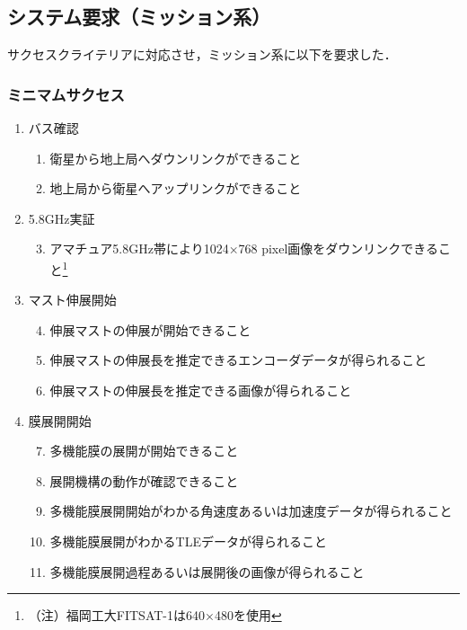 \subsection{システム要求（ミッション系）}

サクセスクライテリアに対応させ，ミッション系に以下を要求した．

\subsubsection{ミニマムサクセス}

\begin{enumerate}
\renewcommand{\labelenumi}{(M\arabic{enumi})}
\renewcommand{\labelenumii}{(mR-\arabic{enumii})}
\item バス確認
\begin{enumerate}
\item 衛星から地上局へダウンリンクができること
\item 地上局から衛星へアップリンクができること
\end{enumerate}
\item 5.8GHz実証
\begin{enumerate}
	\setcounter{enumii}{2}
\item アマチュア5.8GHz帯により1024×768 pixel画像をダウンリンクできること\footnote{（注）福岡工大FITSAT-1は640×480を使用}
\end{enumerate}
\item マスト伸展開始
\begin{enumerate}
		\setcounter{enumii}{3}
\item 伸展マストの伸展が開始できること
\item 伸展マストの伸展長を推定できるエンコーダデータが得られること
\item 伸展マストの伸展長を推定できる画像が得られること
\end{enumerate}
\item 膜展開開始
\begin{enumerate}
		\setcounter{enumii}{6}
\item 多機能膜の展開が開始できること
\item 展開機構の動作が確認できること
\item 多機能膜展開開始がわかる角速度あるいは加速度データが得られること
\item 多機能膜展開がわかるTLEデータが得られること
\item 多機能膜展開過程あるいは展開後の画像が得られること
\end{enumerate}
\end{enumerate}

